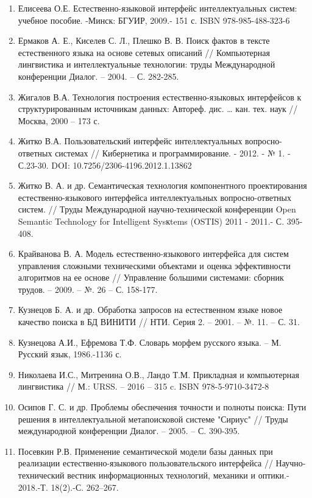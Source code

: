 \begin{enumerate}
\def\labelenumi{\arabic{enumi}.}
\item
  Елисеева О.Е. Естественно-языковой интерфейс интеллектуальных систем:
  учебное пособие. -Минск: БГУИР, 2009.- 151 с. ISBN 978-985-488-323-6
\item
  Ермаков А. Е., Киселев С. Л., Плешко В. В. Поиск фактов в тексте
  естественного языка на основе сетевых описаний // Компьютерная
  лингвистика и интеллектуальные технологии: труды Международной
  конференции Диалог. -- 2004. -- С. 282-285.
\item
  Жигалов В.А. Технология построения естественно-языковых интерфейсов к
  структурированным источникам данных: Автореф. дис. \ldots{} кан. тех.
  наук // Москва, 2000 -- 173 с.
\item
  Житко В.А. Пользовательский интерфейс интеллектуальных
  вопросно-ответных системах // Кибернетика и программирование. - 2012.
  - № 1. - С.23-30. DOI: 10.7256/2306-4196.2012.1.13862
\item
  Житко В. А. и др. Семантическая технология компонентного
  проектирования естественно-языкового интерфейса интеллектуальных
  вопросно-ответных систем. // Труды Международной научно-технической
  конференции Open Semantic Technology for Intelligent Sysкtems (OSTIS)
  2011 - 2011.- С. 395-408.
\item
  Крайванова В. А. Модель естественно-языкового интерфейса для систем
  управления сложными техническими объектами и оценка эффективности
  алгоритмов на ее основе // Управление большими системами: сборник
  трудов. -- 2009. -- №. 26 -- С. 158-177.
\item
  Кузнецов Б. А. и др. Обработка запросов на естественном языке новое
  качество поиска в БД ВИНИТИ // НТИ. Серия 2. -- 2001. -- №. 11. -- С.
  31.
\item
  Кузнецова А.И., Ефремова Т.Ф. Словарь морфем русского языка. -- М.
  Русский язык, 1986.-1136 с.
\item
  Николаева И.С., Митренина О.В., Ландо Т.М. Прикладная и компьютерная
  лингвистика // М.: URSS. -- 2016 -- 315 c. ISBN 978-5-9710-3472-8
\item
  Осипов Г. С. и др. Проблемы обеспечения точности и полноты поиска:
  Пути решения в интеллектуальной метапоисковой системе "Сириус" //
  Труды международной конференции Диалог. -- 2005. -- С. 390-395.
\item
  Посевкин Р.В. Применение семантической модели базы данных при
  реализации естественно-языкового пользовательского интерфейса //
  Научно-технический вестник информационных технологий, механики и
  оптики.- 2018.-Т. 18(2).-С. 262--267.
\end{enumerate}

